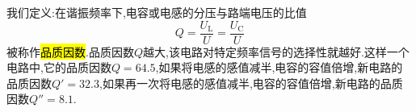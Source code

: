 \Par 我们定义:在谐振频率下,电容或电感的分压与路端电压的比值
\begin{equation}
    Q=\frac{U_{\mathrm{L}}}{U}=\frac{U_{\mathrm{C}}}{U}
\end{equation}
被称作\hl{品质因数}.品质因数$Q$越大,该电路对特定频率信号的选择性就越好.这样一个电路中,它的品质因数$Q=64.5$,如果将电感的感值减半,电容的容值倍增,新电路的品质因数$Q'=32.3$,如果再一次将电感的感值减半,电容的容值倍增,新电路的品质因数$Q''=8.1$.








